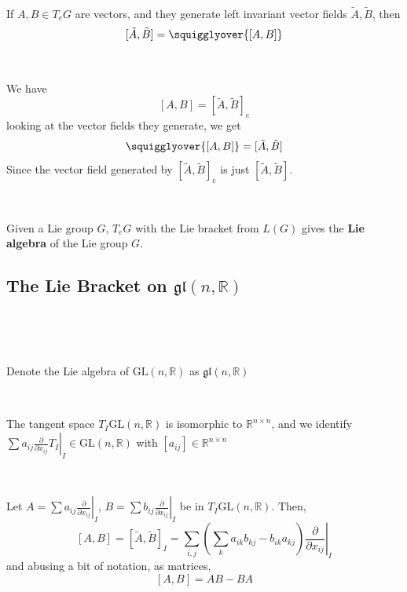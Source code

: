 \documentclass{article}
\begin{document}
\begin{proposition}
  \

  If $A,B \in T_eG$ are vectors, and they generate left invariant vector fields $\tilde{A}, \tilde{B}$, then $$[\tilde{A},\tilde{B}] = \squigglyover{[A,B]}$$
\end{proposition}

\begin{customproof}
  \

  We have $$[A,B] = [\tilde{A}, \tilde{B}]_e$$looking at the vector fields they generate, we get $$\squigglyover{[A,B]} = [\tilde{A}, \tilde{B}]$$Since the vector field generated by $[\tilde{A}, \tilde{B}]_e$ is just $[\tilde{A}, \tilde{B}]$.
\end{customproof}

\begin{definition}
  \

  Given a Lie group $G$, $T_eG$ with the Lie bracket from $L(G)$ gives the \textbf{Lie algebra} of the Lie group $G$.
\end{definition}

\subsection{The Lie Bracket on $\mathfrak{gl}(n, \mathbb{R})$}
\

\begin{definition}
  \

  Denote the Lie algebra of $\text{GL}(n, \mathbb{R})$ as $\mathfrak{gl}(n, \mathbb{R})$
\end{definition}

\begin{remark}
  \

  The tangent space $T_I\text{GL}(n, \mathbb{R})$ is isomorphic to $\mathbb{R}^{n \times n}$, and we identify $\sum a_{ij} \left.\frac{\partial}{\partial x_{ij}}T_I\right\vert_I \in \text{GL}(n, \mathbb{R})$ with $[a_{ij}] \in \mathbb{R}^{n \times n}$
\end{remark}

\begin{proposition}
  \

  Let $A = \sum a_{ij} \left.\frac{\partial}{\partial x_{ij}}\right\vert_I$, $B = \sum b_{ij} \left.\frac{\partial}{\partial x_{ij}}\right\vert_I$ be in $T_I\text{GL}(n, \mathbb{R})$. Then, $$[A,B] = [\tilde{A},\tilde{B}]_I = \sum_{i,j} (\sum_ka_{ik} b_{kj} - b_{ik}a_{kj})\left.\frac{\partial}{\partial x_{ij}}\right\vert_I$$and abusing a bit of notation, as matrices, $$[A,B] = AB - BA$$
\end{proposition}
\end{document}
